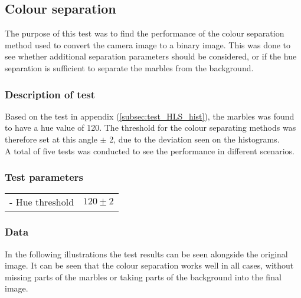 \documentclass[../Head/Main.tex]{subfiles}
\begin{document}
\subsection{Colour separation}
\label{subsec:test_colour_separation}
The purpose of this test was to find the performance of the colour separation method used to convert the camera image to a binary image. This was done to see whether additional separation parameters should be considered, or if the hue separation is sufficient to separate the marbles from the background.
\subsubsection*{Description of test}
Based on the test in appendix (\ref{subsec:test_HLS_hist}), the marbles was found to have a hue value of 120. The threshold for the colour separating methods was therefore set at this angle $\pm$ 2, due to the deviation seen on the histograms.\\
A total of five tests was conducted to see the performance in different scenarios. 

\subsubsection*{Test parameters}
\begin{minipage}[c]{0.35\textwidth}
	\begin{tabular}{l r}
	- Hue threshold                   & $120\pm 2$\\
	\end{tabular}
\end{minipage}	

\subsubsection*{Data}
In the following illustrations the test results can be seen alongside the original image. It can be seen that the colour separation works well in all cases, without missing parts of the marbles or taking parts of the background into the final image.
\end{document}
